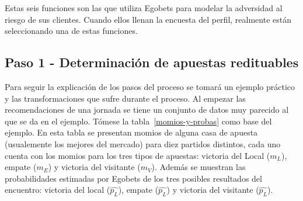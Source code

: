 Estas seis funciones son las que utiliza Egobets para modelar la adversidad al riesgo de sus clientes. Cuando ellos llenan la encuesta del perfil, realmente están seleccionando una de estas funciones.


\subsection{Paso 1 - Determinación de apuestas redituables}
\label{sec:paso-1}


Para seguir la explicación de los pasos del proceso se tomará un ejemplo práctico y las transformaciones que sufre durante el proceso. Al empezar las recomendaciones de una jornada se tiene un conjunto de datos muy parecido al que se da en el ejemplo. Tómese la tabla~\ref{momios-y-probas} como base del ejemplo. En esta tabla se presentan momios de alguna casa de apuesta (usualemente los mejores del mercado) para diez partidos distintos, cada uno cuenta con los momios para los tres tipos de apuestas: victoria del Local ($m_L$), empate ($m_E$) y victoria del visitante ($m_V$). Además se muestran las probabilidades estimadas por Egobets de los tres posibles resultados del encuentro: victoria del local ($\hat{p_L}$), empate ($\hat{p_L}$) y victoria del visitante ($\hat{p_L}$).

\begin{table}[ht]
\centering
{}
\caption{Diez partidos con sus respectivos momios y las probabilidades estimadas por Egobets}
\label{momios-y-probas}
\end{table}

